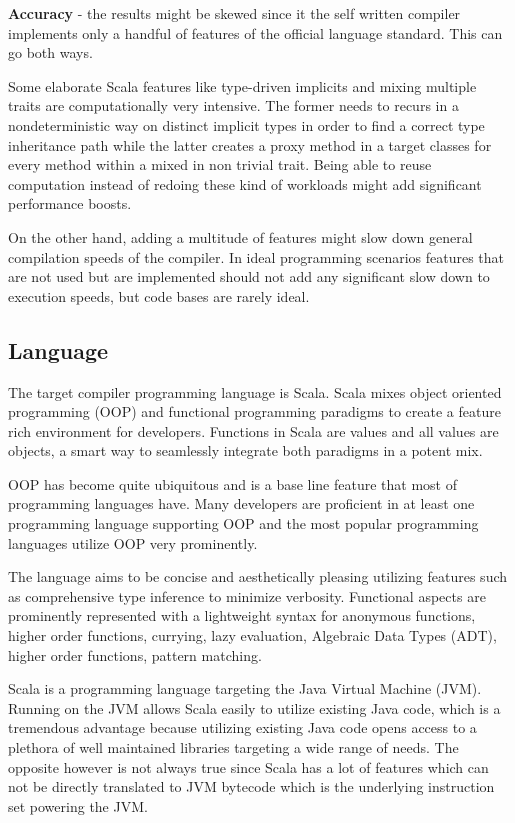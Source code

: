 \documentclass{VUMIFPSbakalaurinis}
\begin{document}
\textbf{Accuracy} - the results might be skewed since it the self written compiler implements only a handful of features of the official language standard.
This can go both ways.

Some elaborate Scala features like type-driven implicits and mixing multiple traits are computationally very intensive.
The former needs to recurs in a nondeterministic way on distinct implicit types in order to find a correct type inheritance path while the latter creates a proxy method in a target classes for every method within a mixed in non trivial trait.
Being able to reuse computation instead of redoing these kind of workloads might add significant performance boosts.

On the other hand, adding a multitude of features might slow down general compilation speeds of the compiler.
In ideal programming scenarios features that are not used but are implemented should not add any significant slow down to execution speeds, but code bases are rarely ideal.

\subsection{Language}
The target compiler programming language is Scala.
Scala mixes object oriented programming (OOP)  and functional programming paradigms to create a feature rich environment for developers.
Functions in Scala are values and all values are objects, a smart way to seamlessly integrate both paradigms in a potent mix.

OOP has become quite ubiquitous and is a base line feature that most of programming languages have.
Many developers are proficient in at least one programming language supporting OOP and the most popular programming languages utilize OOP very prominently.

The language aims to be concise and aesthetically pleasing utilizing features such as comprehensive type inference to minimize verbosity.
Functional aspects are prominently represented with a lightweight syntax for anonymous functions, higher order functions, currying, lazy evaluation, Algebraic Data Types (ADT), higher order functions, pattern matching.

Scala is a programming language targeting the Java Virtual Machine (JVM).
Running on the JVM allows Scala easily to utilize existing Java code, which is a tremendous advantage because utilizing existing Java code opens access to a plethora of well maintained libraries targeting a wide range of needs.
The opposite however is not always true since Scala has a lot of features which can not be directly translated to JVM bytecode which is the underlying instruction set powering the JVM.
\end{document}
